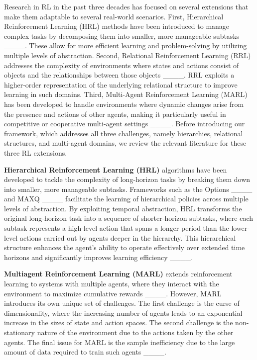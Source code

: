 Research in RL in the past three decades has focused on several extensions that make them adaptable to several real-world scenarios. First, Hierarchical Reinforcement Learning (HRL) methods have been introduced to manage complex tasks by decomposing them into smaller, more manageable subtasks ____. These allow for more efficient learning and problem-solving by utilizing multiple levels of abstraction. Second, Relational Reinforcement Learning (RRL) addresses the complexity of environments where states and actions consist of objects and the relationships between those objects ____. RRL exploits a higher-order representation of the underlying relational structure to improve learning in such domains. Third, Multi-Agent Reinforcement Learning (MARL) has been developed to handle environments where dynamic changes arise from the presence and actions of other agents, making it particularly useful in competitive or cooperative multi-agent settings ____. Before introducing our framework, which addresses all three challenges, namely hierarchies, relational structures, and multi-agent domains, we review the relevant literature for these three RL extensions.

\textbf{Hierarchical Reinforcement Learning (HRL)} algorithms have been developed to tackle the complexity of long-horizon tasks by breaking them down into smaller, more manageable subtasks. Frameworks such as the Options  ____ and MAXQ ____ facilitate the learning of hierarchical policies across multiple levels of abstraction. By exploiting temporal abstraction, HRL transforms the original long-horizon task into a sequence of shorter-horizon subtasks, where each subtask represents a high-level action that spans a longer period than the lower-level actions carried out by agents deeper in the hierarchy. This hierarchical structure enhances the agent’s ability to operate effectively over extended time horizons and significantly improves learning efficiency ____. %

\textbf{Multiagent Reinforcement Learning (MARL)} extends reinforcement learning to systems with multiple agents, where they interact with the environment to maximize cumulative rewards ____. However, MARL introduces its own unique set of challenges. The first challenge is the curse of dimensionality, where the increasing number of agents leads to an exponential increase in the sizes of state and action spaces. The second challenge is the non-stationary nature of the environment %
due to the actions taken by the other agents. The final issue for MARL is the sample inefficiency due to the large amount of data required to train such agents ____.

